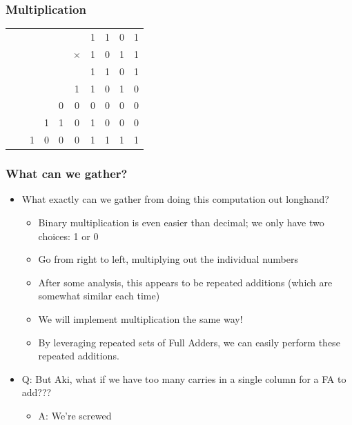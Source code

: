 \documentclass{beamer}
\begin{document}
    	
    	\begin{frame}
    		\frametitle{Multiplication}

			\centering    		
    		
    		{\Huge
			\begin{tabular}{c@{\,}c@{\,}c@{\,}c@{\,}c@{\,}c@{\,}c@{\,}c@{\,}c@{\,}c}
					   & &  &  &  &  & 1 & 1 & 0 & 1 \\
					   & &  &  &  & $\times$ & 1 & 0 & 1 & 1 \\
					   \hline
					   & &  &  &  &   & 1 & 1 & 0 & 1 \\
					   & &  &  &  & 1 & 1 & 0 & 1 & {\color{red}0} \\
					   & &  &  & 0 & 0 & 0 & 0 & {\color{red}0} & {\color{red}0} \\
					   & &  & 1 & 1 & 0 & 1 & {\color{red}0} & {\color{red}0} & {\color{red}0} \\
					   \hline
					    &  & 1 & 0 & 0 & 0 & 1 & 1 & 1 & 1
					
					
			\end{tabular}}
			\vfill
    	\end{frame}
    	
    	
    	\begin{frame}
    		\frametitle{What can we gather?}
    		\begin{itemize}
    			\item What exactly can we gather from doing this computation out longhand?
    			\begin{itemize}
    				\item Binary multiplication is even easier than decimal; we only have two choices: 1 or 0
    				\item Go from right to left, multiplying out the individual numbers
    				\item After some analysis, this appears to be repeated additions (which are somewhat similar each time)
    				\item We will implement multiplication the same way!
    				\item By leveraging repeated sets of Full Adders, we can easily perform these repeated additions.
    			\end{itemize}
    			\item Q: But Aki, what if we have too many carries in a single column for a FA to add???
    			\begin{itemize}
    				\item A: We're screwed
    			\end{itemize}
    		\end{itemize}
    	\end{frame}
    	
\end{document}
